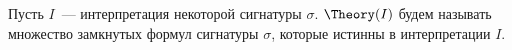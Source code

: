 Пусть $I$~--- интерпретация некоторой сигнатуры $\sigma$.  $\Theory(I)$ будем называть
множество замкнутых формул сигнатуры $\sigma$, которые истинны в интерпретации $I$.